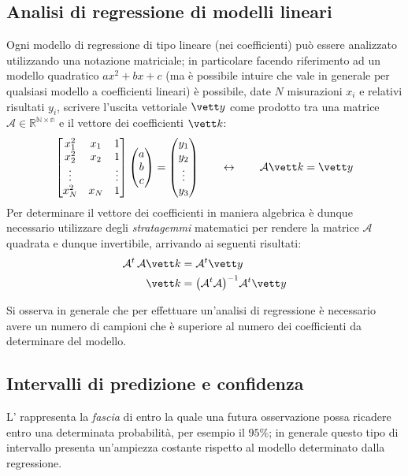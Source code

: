 	\subsection{Analisi di regressione di modelli lineari}
		Ogni modello di regressione di tipo lineare (nei coefficienti) può essere analizzato utilizzando una notazione matriciale; in particolare facendo riferimento ad un modello quadratico $ax^2 + bx + c$ (ma è possibile intuire che vale in generale per qualsiasi modello a coefficienti lineari) è possibile, date $N$ misurazioni $x_i$ e relativi risultati $y_i$, scrivere l'uscita vettoriale $\vett y$ come prodotto tra una matrice $\mathcal A\in \mathds{ R^{N\times n}}$ e il vettore dei coefficienti $\vett k$:
		\[ \begin{bmatrix}
			x_1^2 & x_1 & 1 \\
			x_2^2 & x_2 & 1 \\
			\vdots && \vdots \\
			x_N^2 & x_N & 1 
		\end{bmatrix} \begin{pmatrix}
			a \\ b \\ c
		\end{pmatrix} = \begin{pmatrix}
			y_1 \\ y_2 \\ \vdots \\ y_3 
		\end{pmatrix} \qquad \leftrightarrow \qquad \mathcal A \vett k = \vett y \]
		Per determinare il vettore dei coefficienti in maniera algebrica è dunque necessario utilizzare degli \textit{stratagemmi} matematici per rendere la matrice $\mathcal A$ quadrata e dunque invertibile, arrivando ai seguenti risultati:
		\begin{equation}
		\begin{split}
			\mathcal A^t \, \mathcal A \vett k & = \mathcal A^t \vett y \\
			\vett k & = \big(\mathcal A^t\mathcal A\big)^{-1} \mathcal A^t \vett y
		\end{split}
		\end{equation}
		
		Si osserva in generale che per effettuare un'analisi di regressione è necessario avere un numero di campioni che è superiore al numero dei coefficienti da determinare del modello.
		
	\subsection{Intervalli di predizione e confidenza} \label{sec:stat:regrpred}
		L' rappresenta la \textit{fascia} di entro la quale una futura osservazione possa ricadere entro una determinata probabilità, per esempio il $95\%$; in generale questo tipo di intervallo presenta un'ampiezza costante rispetto al modello determinato dalla regressione.
		
